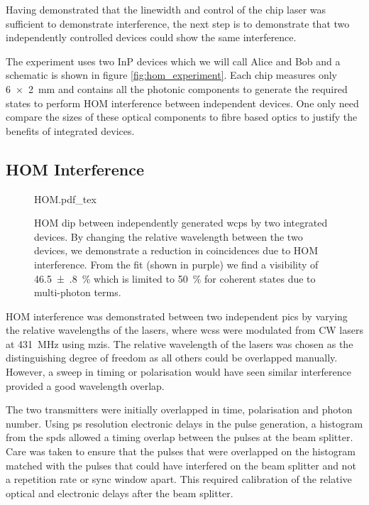 Having demonstrated that the linewidth and control of the chip laser was sufficient to demonstrate interference, the next step is to demonstrate that two independently controlled devices could show the same interference. 

The experiment uses two \ac{InP} devices which we will call Alice and Bob and a schematic is shown in figure \ref{fig:hom_experiment}. Each chip measures only \SI{6x2}{mm} and contains all the photonic components to generate the required states to perform \ac{HOM} interference between independent devices. One only need compare the sizes of these optical components to fibre based optics to justify the benefits of integrated devices.



\subsection{HOM Interference}

\begin{figure}[t]
	\centering
	\def\svgwidth{0.8\textwidth} 
	{HOM.pdf_tex}
	\caption[Hong-Ou-Mandel interference between integrated devices]{\ac{HOM} dip between independently generated \acp{wcp} by two integrated devices. By changing the relative wavelength between the two devices, we demonstrate a reduction in coincidences due to \ac{HOM} interference. From the fit (shown in purple) we find a visibility of \SI{46.5(8)}{\%} which is limited to \SI{50}{\percent} for coherent states due to multi-photon terms.}
	\label{fig:HOM}
\end{figure}
\begin{parahigh}
\acl{HOM} interference was demonstrated between two independent \acp{pic} by varying the relative wavelengths of the lasers, where \acp{wcs} were modulated from \ac{CW} lasers at \SI{431}{\MHz} using \acp{mzi}. The relative wavelength of the lasers was chosen as the distinguishing degree of freedom as all others could be overlapped manually. However, a sweep in timing or polarisation would have seen similar interference provided a good wavelength overlap. 
\end{parahigh}
The two transmitters were initially overlapped in time, polarisation and photon number. Using ps resolution electronic delays in the pulse generation, a histogram from the \acp{spd} allowed a timing overlap between the pulses at the beam splitter. Care was taken to ensure that the pulses that were overlapped on the histogram matched with the pulses that could have interfered on the beam splitter and not a repetition rate or sync window apart. This required calibration of the relative optical and electronic delays after the beam splitter. 

